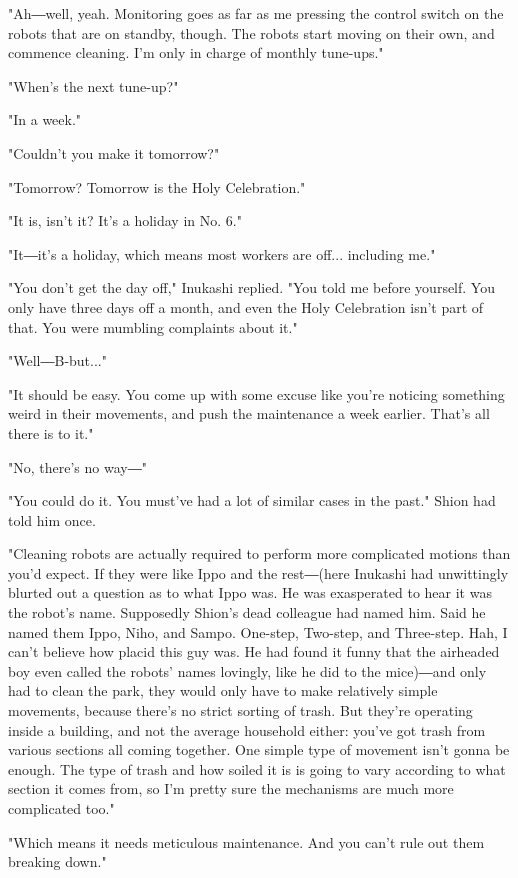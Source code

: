 "Ah―well, yeah. Monitoring goes as far as me pressing the control switch
on the robots that are on standby, though. The robots start moving on
their own, and commence cleaning. I'm only in charge of monthly
tune-ups."

"When's the next tune-up?"

"In a week."

"Couldn't you make it tomorrow?"

"Tomorrow? Tomorrow is the Holy Celebration."

"It is, isn't it? It's a holiday in No. 6."

"It―it's a holiday, which means most workers are off... including me."

"You don't get the day off," Inukashi replied. "You told me before
yourself. You only have three days off a month, and even the Holy
Celebration isn't part of that. You were mumbling complaints about it."

"Well―B-but..."

"It should be easy. You come up with some excuse like you're noticing
something weird in their movements, and push the maintenance a week
earlier. That's all there is to it."

"No, there's no way―"

"You could do it. You must've had a lot of similar cases in the past."
Shion had told him once.

"Cleaning robots are actually required to perform more complicated
motions than you'd expect. If they were like Ippo and the rest―(here
Inukashi had unwittingly blurted out a question as to what Ippo was. He
was exasperated to hear it was the robot's name. Supposedly Shion's dead
colleague had named him. Said he named them Ippo, Niho, and Sampo.
One-step, Two-step, and Three-step. Hah, I can't believe how placid this
guy was. He had found it funny that the airheaded boy even called the
robots' names lovingly, like he did to the mice)―and only had to clean
the park, they would only have to make relatively simple movements,
because there's no strict sorting of trash. But they're operating inside
a building, and not the average household either: you've got trash from
various sections all coming together. One simple type of movement isn't
gonna be enough. The type of trash and how soiled it is is going to vary
according to what section it comes from, so I'm pretty sure the
mechanisms are much more complicated too."~

"Which means it needs meticulous maintenance. And you can't rule out
them breaking down."

